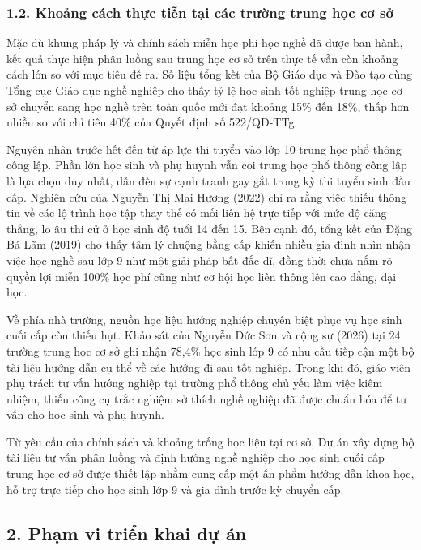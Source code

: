 \subsubsection*{1.2. Khoảng cách thực tiễn tại các trường trung học cơ sở}

Mặc dù khung pháp lý và chính sách miễn học phí học nghề đã được ban hành, kết quả thực hiện phân luồng sau trung học cơ sở trên thực tế vẫn còn khoảng cách lớn so với mục tiêu đề ra. Số liệu tổng kết của Bộ Giáo dục và Đào tạo cùng Tổng cục Giáo dục nghề nghiệp cho thấy tỷ lệ học sinh tốt nghiệp trung học cơ sở chuyển sang học nghề trên toàn quốc mới đạt khoảng 15\% đến 18\%, thấp hơn nhiều so với chỉ tiêu 40\% của Quyết định số 522/QĐ-TTg.

Nguyên nhân trước hết đến từ áp lực thi tuyển vào lớp 10 trung học phổ thông công lập. Phần lớn học sinh và phụ huynh vẫn coi trung học phổ thông công lập là lựa chọn duy nhất, dẫn đến sự cạnh tranh gay gắt trong kỳ thi tuyển sinh đầu cấp. Nghiên cứu của Nguyễn Thị Mai Hương (2022) chỉ ra rằng việc thiếu thông tin về các lộ trình học tập thay thế có mối liên hệ trực tiếp với mức độ căng thẳng, lo âu thi cử ở học sinh độ tuổi 14 đến 15. Bên cạnh đó, tổng kết của Đặng Bá Lãm (2019) cho thấy tâm lý chuộng bằng cấp khiến nhiều gia đình nhìn nhận việc học nghề sau lớp 9 như một giải pháp bất đắc dĩ, đồng thời chưa nắm rõ quyền lợi miễn 100\% học phí cũng như cơ hội học liên thông lên cao đẳng, đại học.

Về phía nhà trường, nguồn học liệu hướng nghiệp chuyên biệt phục vụ học sinh cuối cấp còn thiếu hụt. Khảo sát của Nguyễn Đức Sơn và cộng sự (2026) tại 24 trường trung học cơ sở ghi nhận 78,4\% học sinh lớp 9 có nhu cầu tiếp cận một bộ tài liệu hướng dẫn cụ thể về các hướng đi sau tốt nghiệp. Trong khi đó, giáo viên phụ trách tư vấn hướng nghiệp tại trường phổ thông chủ yếu làm việc kiêm nhiệm, thiếu công cụ trắc nghiệm sở thích nghề nghiệp đã được chuẩn hóa để tư vấn cho học sinh và phụ huynh.

Từ yêu cầu của chính sách và khoảng trống học liệu tại cơ sở, Dự án xây dựng bộ tài liệu tư vấn phân luồng và định hướng nghề nghiệp cho học sinh cuối cấp trung học cơ sở được thiết lập nhằm cung cấp một ấn phẩm hướng dẫn khoa học, hỗ trợ trực tiếp cho học sinh lớp 9 và gia đình trước kỳ chuyển cấp.

\subsection*{2. Phạm vi triển khai dự án}

